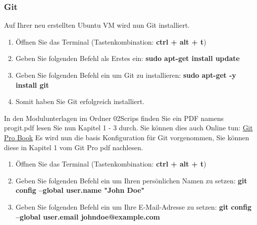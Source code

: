 \subsubsection{Git}\label{subsubsec:git}
\begin{frame}[fragile]
    Auf Ihrer neu erstellten Ubuntu VM wird nun Git installiert.
    \begin{enumerate}
        \item Öffnen Sie das Terminal (Tastenkombination: \textbf{ctrl + alt + t})
        \item Geben Sie folgenden Befehl als Erstes ein: \textbf{sudo apt-get install update}
        \item Geben Sie folgenden Befehl ein um Git zu installieren: \textbf{sudo apt-get -y install git}
        \item Somit haben Sie Git erfolgreich installiert.
    \end{enumerate}
    In den Modulunterlagen im Ordner 02\textunderscore Scrips finden Sie ein PDF namens progit.pdf lesen Sie nun
    Kapitel 1 - 3 durch.
    Sie können dies auch Online tun: \href{https://git-scm.com/book/en/v2}{Git Pro Book}
    Es wird nun die basis Konfiguration für Git vorgenommen, Sie können diese in Kapitel 1 vom Git Pro pdf nachlesen.
    \begin{enumerate}
        \item Öffnen Sie das Terminal (Tastenkombination: \textbf{ctrl + alt + t})
        \item Geben Sie folgenden Befehl ein um Ihren persönlichen Namen zu setzen: \newline\textbf{git config --global user.name "John Doe"}
        \item Geben Sie folgenden Befehl ein um Ihre E-Mail-Adresse zu setzen: \newline\textbf{git config --global user.email johndoe@example.com}
    \end{enumerate}
\end{frame}


